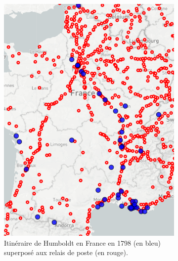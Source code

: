 \documentclass[a4paper, 12pt, twoside]{book}
\begin{document}
\begin{figure}[h!]
    \centering
    \caption{Copies d'écran de \textit{Humboldt Chronotopographie}}
         \begin{subfigure}[b]{0.4\textwidth}
         \centering
         \includegraphics[height=1.4\textwidth]{img/chronotopographie/chrono_frankreich_poststationen.png}
         \caption{Itinéraire de Humboldt en France en 1798 (en bleu) superposé aux relais de poste (en rouge).}
        \end{subfigure}
        \hfill
        \begin{subfigure}[b]{0.4\textwidth}
         \centering

\end{subfigure}
\end{figure}
\end{document}
